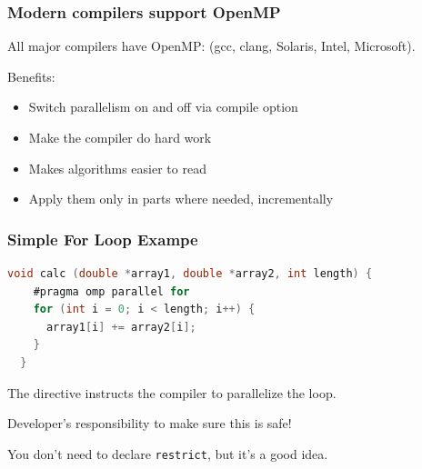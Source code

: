 \begin{frame}[containsverbatim]
  \frametitle{Modern compilers support OpenMP}

All major compilers have OpenMP: (gcc, clang, Solaris, Intel, Microsoft).

Benefits:
\begin{itemize}
	\item Switch parallelism on and off via compile option
	\item Make the compiler do hard work
	\item Makes algorithms easier to read
	\item Apply them only in parts where needed, incrementally
\end{itemize}

\end{frame}



\begin{frame}[fragile]
\frametitle{Simple For Loop Exampe}

\begin{lstlisting}[language=C,morekeywords={foreach,pragma,omp,parallel,single,nowait,task,untied,barrier,taskyield}]
  void calc (double *array1, double *array2, int length) {
    #pragma omp parallel for
    for (int i = 0; i < length; i++) {
      array1[i] += array2[i];
    }
  }
\end{lstlisting}

The directive instructs the compiler to parallelize the loop.

Developer's responsibility to make sure this is safe!

You don't need to declare {\tt restrict}, but it's a good idea.

\end{frame}


